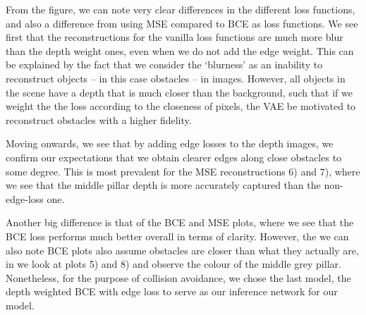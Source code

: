 From the figure, we can note very clear differences in the different loss functions, and also a difference from using MSE compared to BCE as loss functions. We see first that the reconstructions for the vanilla loss functions are much more blur than the depth weight ones, even when we do not add the edge weight. This can be explained by the fact that we consider the `blurness' as an inability to reconstruct objects -- in this case obstacles -- in images. However, all objects in the scene have a depth that is much closer than the background, such that if we weight the the loss according to the closeness of pixels, the VAE be motivated to reconstruct obstacles with a higher fidelity. 

Moving onwards, we see that by adding edge losses to the depth images, we confirm our expectations that we obtain clearer edges along close obstacles to some degree. This is most prevalent for the MSE reconstructions 6) and 7), where we see that the middle pillar depth is more accurately captured than the non-edge-loss one. 

Another big difference is that of the BCE and MSE plots, where we see that the BCE loss performs much better overall in terms of clarity. However, the we can also note BCE plots also assume obstacles are closer than what they actually are, in we look at plots 5) and 8) and observe the colour of the middle grey pillar. Nonetheless, for the purpose of collision avoidance, we chose the last model, the depth weighted BCE with edge loss to serve as our inference network for our model.

















